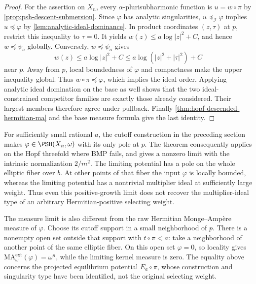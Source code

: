 \begin{proof}
For the assertion on $X_n$, every $\alpha$-plurisubharmonic function is $u=w\circ\pi$ by \cref{prop:psh-descent-submersion}. Since $\varphi$ has analytic singularities, $u\preceq_{\mathcal I}\varphi$ implies $u\preceq\varphi$ by \cref{lem:analytic-ideal-dominance}. In product coordinates $(z,\tau)$ at $p$, restrict this inequality to $\tau=0$. It yields $w(z)\leq a\log|z|^2+C$, and hence $w\preceq\psi_a$ globally. Conversely, $w\preceq\psi_a$ gives
\[
 w(z)\leq a\log|z|^2+C
             \leq a\log(|z|^2+|\tau|^2)+C
\]
near $p$. Away from $p$, local boundedness of $\varphi$ and compactness make the upper inequality global. Thus $w\circ\pi\preceq\varphi$, which implies the ideal order. Applying analytic ideal domination on the base as well shows that the two ideal-constrained competitor families are exactly those already considered. Their largest members therefore agree under pullback. Finally \cref{thm:hopf-descended-hermitian-ma} and the base measure formula give the last identity.
\end{proof}

For sufficiently small rational $a$, the cutoff construction in the preceding section makes $\varphi\in\PSH(X_n,\omega)$ with its only pole at $p$. The theorem consequently applies on the Hopf threefold where BMP fails, and gives a nonzero limit with the intrinsic normalization $2/m^2$. The limiting potential has a pole on the whole elliptic fiber over $b$. At other points of that fiber the input $\varphi$ is locally bounded, whereas the limiting potential has a nontrivial multiplier ideal at sufficiently large weight. Thus even this positive-growth limit does not recover the multiplier-ideal type of an arbitrary Hermitian-positive selecting weight.

The measure limit is also different from the raw Hermitian Monge--Amp\`ere measure of $\varphi$. Choose its cutoff support in a small neighborhood of $p$. There is a nonempty open set outside that support with $t\circ\pi<a$: take a neighborhood of another point of the same elliptic fiber. On this open set $\varphi=0$, so locality gives $\mathrm{MA}^{\mathrm{ext}}_\omega(\varphi)=\omega^n$, while the limiting kernel measure is zero. The equality above concerns the projected equilibrium potential $E_a\circ\pi$, whose construction and singularity type have been identified, not the original selecting weight.
